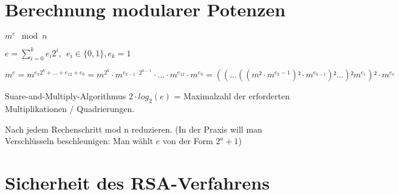 \section{Berechnung modularer Potenzen}

$m^e \mod n$

\begin{center}
  $e = \sum_{i=0}^{k} e_i2^i, \ \ e_i \in \{0,1\}, e_k = 1$
\end{center}

$m^e = m^{e_k2^k + ... + e_12+e_0} = m^{2^k} \cdot m^{e_{k-1}\cdot 2^{k-1}} \cdot ... \cdot m^{e_12} \cdot m^{e_0} = ((...((m² \cdot m^{e_k-1})² \cdot m^{e_{k-1}})² ...)² m^{e_1})² \cdot m^{e_o}$

Suare-and-Multiply-Algorithmus  $2 \cdot log_2(e)$ = Maximalzahl der erforderten Multiplikationen / Quadrierungen.

\par \medskip

Nach jedem Rechenschritt mod n reduzieren. (In der Praxis will man Verschlüsseln beschleunigen: Man wählt $e$ von der Form $2^a+1$)

\section{Sicherheit des RSA-Verfahrens}

